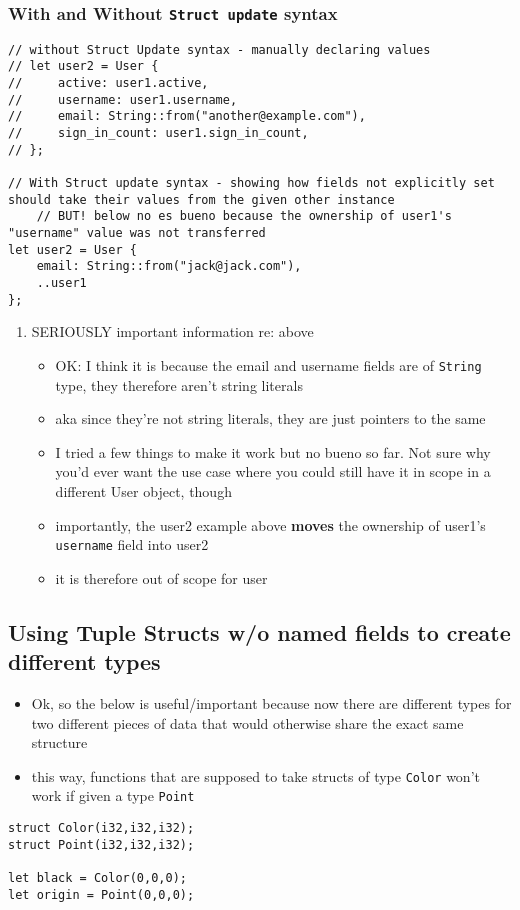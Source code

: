 \documentclass[11pt]{article}
\begin{document}
\subsubsection{With and Without \texttt{Struct update} syntax}
\label{sec:org69e228b}
\begin{verbatim}
// without Struct Update syntax - manually declaring values
// let user2 = User {
//     active: user1.active,
//     username: user1.username,
//     email: String::from("another@example.com"),
//     sign_in_count: user1.sign_in_count,
// };

// With Struct update syntax - showing how fields not explicitly set should take their values from the given other instance
    // BUT! below no es bueno because the ownership of user1's "username" value was not transferred
let user2 = User {
    email: String::from("jack@jack.com"),
    ..user1
};

\end{verbatim}
\begin{enumerate}
\item SERIOUSLY important information re: above
\label{sec:orgb1b206d}
\begin{itemize}
\item OK: I think it is because the email and username fields are of \texttt{String} type, they therefore aren't string literals
\item aka since they're not string literals, they are just pointers to the same
\item I tried a few things to make it work but no bueno so far. Not sure why you'd ever want the use case where you could still have it in scope in a different User object, though
\item importantly, the user2 example above \textbf{moves} the ownership of user1's \texttt{username} field into user2
\item it is therefore out of scope for user
\end{itemize}
\end{enumerate}
\subsection{Using Tuple Structs w/o named fields to create different types}
\label{sec:orgf5db4d2}
\begin{itemize}
\item Ok, so the below is useful/important because now there are different types for two different pieces of data that would otherwise share the exact same structure
\item this way, functions that are supposed to take structs of type \texttt{Color} won't work if given a type \texttt{Point}
\end{itemize}
\begin{verbatim}
struct Color(i32,i32,i32);
struct Point(i32,i32,i32);

let black = Color(0,0,0);
let origin = Point(0,0,0);
\end{verbatim}
\end{document}
